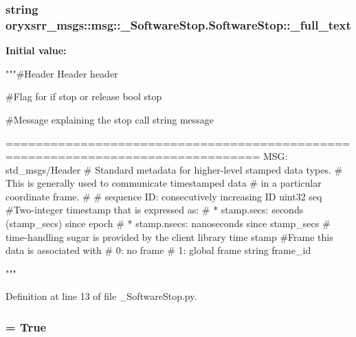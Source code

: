\subsubsection[{\-\_\-full\-\_\-text}]{\setlength{\rightskip}{0pt plus 5cm}string {\bf oryxsrr\-\_\-msgs\-::msg\-::\-\_\-\-Software\-Stop.\-Software\-Stop\-::\-\_\-full\-\_\-text}\hspace{0.3cm}{\ttfamily  [static, private]}}\label{classoryxsrr__msgs_1_1msg_1_1__SoftwareStop_1_1SoftwareStop_a3937ceebd0f7b617923ed2a405bd562c}
{\bfseries \-Initial value\-:}
\begin{DoxyCode}
"""#Header
Header header

#Flag for if stop or release
bool stop

#Message explaining the stop call
string message

      ================================================================================
MSG: std_msgs/Header
# Standard metadata for higher-level stamped data types.
# This is generally used to communicate timestamped data 
# in a particular coordinate frame.
# 
# sequence ID: consecutively increasing ID 
uint32 seq
#Two-integer timestamp that is expressed as:
# * stamp.secs: seconds (stamp_secs) since epoch
# * stamp.nsecs: nanoseconds since stamp_secs
# time-handling sugar is provided by the client library
time stamp
#Frame this data is associated with
# 0: no frame
# 1: global frame
string frame_id

"""
\end{DoxyCode}


\-Definition at line 13 of file \-\_\-\-Software\-Stop.\-py.

\subsubsection[{\-\_\-has\-\_\-header}]{ = \-True\hspace{0.3cm}{\ttfamily  [static, private]}}\label{classoryxsrr__msgs_1_1msg_1_1__SoftwareStop_1_1SoftwareStop_adb6ed15cb572b01255f0f27599bfa725}


